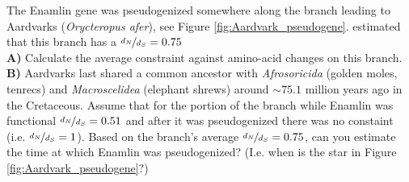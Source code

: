 \begin{question}{}
The Enamlin gene was pseudogenized somewhere along the branch leading to
Aardvarks ({\it Orycteropus afer}), see Figure
\ref{fig:Aardvark_pseudogene}. \citet{Meredith:09} estimated that this
branch has a $\nicefrac{d_N}{d_S}=0.75$\\
{\bf A)} Calculate the average constraint against amino-acid changes
on this branch.\\

{\bf B)} Aardvarks last shared a common ancestor
with {\it Afrosoricida} (golden moles, tenrecs) and {\it Macroscelidea} (elephant
shrews) around $\sim 75.1$ million years ago in the Cretaceous. Assume
that for the portion of the branch while
Enamlin was functional $\nicefrac{d_N}{d_S} = 0.51$  and
after it was pseudogenized there was no constaint (i.e. $\nicefrac{d_N}{d_S} = 1$). Based on the branch's average $\nicefrac{d_N}{d_S}=0.75$, can
you estimate the time at which Enamlin was pseudogenized? (I.e. when
is the star in Figure \ref{fig:Aardvark_pseudogene}?)
\end{question}
